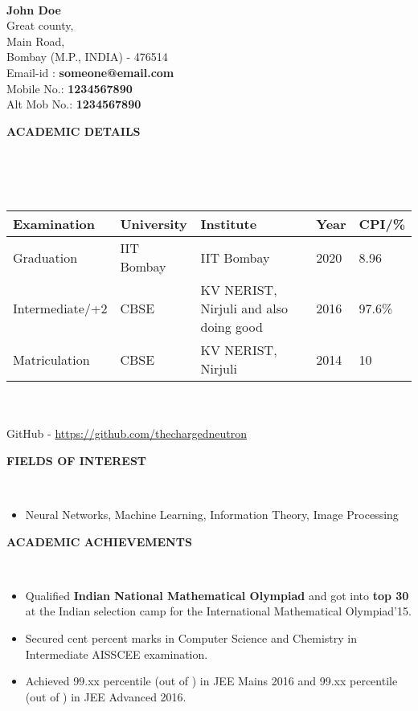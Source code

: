 \documentclass[a4paper,10pt]{article}
\newcommand{\lsep}{-0.5cm}
\newcommand{\resheading}[1]{{\small \colorbox{mygrey}{\begin{minipage}{0.975\textwidth}{\textbf{#1 \vphantom{p\^{E}}}}\end{minipage}}}}
\begin{document}
\hspace{0.5cm}\\[-0.2cm]

\textbf{John Doe} \\
\indent Great county, \\
\indent Main Road,  \\
\indent Bombay (M.P., INDIA) - 476514\\
\indent Email-id : \textbf{someone@email.com} \\
\indent Mobile No.: \textbf{1234567890} \\
\indent Alt Mob No.: \textbf{1234567890} \\

\resheading{\textbf{ACADEMIC DETAILS} }\\[\lsep]
\\ \\
\indent \begin{tabular}{ l @{\hskip 0.15in} l @{\hskip 0.15in} l @{\hskip 0.15in} l @{\hskip 0.15in} l }
\hline
\textbf{Examination} & \textbf{University} & \textbf{Institute } & \textbf{Year} & \textbf{CPI/\%} \\
\hline
Graduation      & IIT Bombay & IIT Bombay & 2020 & 8.96 \\
Intermediate/+2 & CBSE & KV NERIST, Nirjuli and also doing good   & 2016 & 97.6\%\\
Matriculation & CBSE & KV NERIST, Nirjuli & 2014 & 10\\
\hline
\end{tabular}
\\ \\
\indent GitHub - \href{https://github.com/thechargedneutron}{https://github.com/thechargedneutron}
\\

\resheading{\textbf{FIELDS OF INTEREST} }\\[\lsep]
\begin{itemize}
\item \noindent Neural Networks, Machine Learning, Information Theory, Image Processing
\end{itemize}

\resheading{\textbf{ACADEMIC ACHIEVEMENTS} }\\[\lsep]
\begin{itemize}
\item \noindent Qualified \textbf{Indian National Mathematical Olympiad} and got into \textbf{top 30} at the Indian selection camp for the International Mathematical Olympiad'15.
\item \noindent Secured cent percent marks in Computer Science and Chemistry in Intermediate AISSCEE examination.
\item \noindent Achieved 99.xx percentile (out of ) in JEE Mains 2016 and 99.xx percentile (out of ) in JEE Advanced 2016.
\end{itemize}
\end{document}
